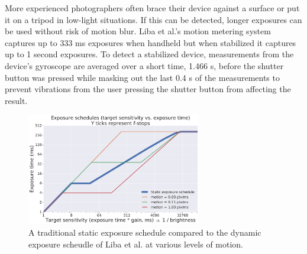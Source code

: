 \documentclass{sig-alternate}
\begin{document}
More experienced photographers often brace their device against a surface or put it on a tripod in low-light situations. If this can be detected, longer exposures can be used without risk of motion blur. Liba et al.'s motion metering system captures up to 333 ms exposures when handheld but when stabilized it captures up to 1 second exposures. To detect a stabilized device, measurements from the device's gyroscope are averaged over a short time, 1.466 s, before the shutter button was pressed while masking out the last 0.4 s of the measurements to prevent vibrations from the user pressing the shutter button from affecting the result.


\begin{figure}
\centering
\includegraphics[width=3in]{figures/liba2019-figure-7.pdf}
\caption{A traditional static exposure schedule compared to the dynamic exposure scheudle of Liba et al. at various levels of motion.~\cite{Liba2019}}
\label{fig:exposure}


\end{figure}
\end{document}
